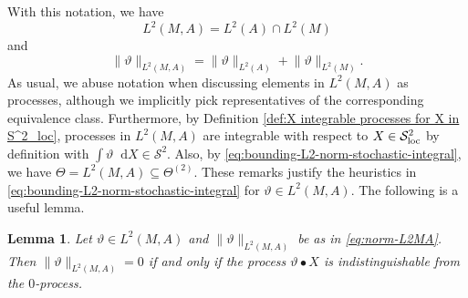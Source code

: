 \documentclass[11pt,a4paper,twoside,openany]{report}
\numberwithin{equation}{section}
\newcommand{\diff}{\mathop{}\!\mathrm{d}}
\theoremstyle{plain} %
\newtheorem{lemma}[theorem]{Lemma}
\theoremstyle{definition} %
\theoremstyle{remark} %
\begin{document}
With this notation, we have
\begin{equation*}
    L^2(M,A)=L^2(A)\cap L^2(M)
\end{equation*}
and \begin{equation}\label{eq:norm-L2MA}
    \lVert \vartheta\rVert_{L^2(M,A)}=\lVert \vartheta\rVert_{L^2(A)}+\lVert \vartheta\rVert_{L^2(M)}.
\end{equation}
As usual, we abuse notation when discussing elements in \(L^2(M,A)\) as processes, although we implicitly pick representatives of the corresponding equivalence class.
 Furthermore, by  Definition \ref{def:X integrable processes for X in S^2_loc}, processes in \(L^2(M,A)\) are integrable with respect to \(X\in\mathcal{S}^2_{\rm{\rm{loc}}}\) by definition with \(\int \vartheta\diff X\in\mathcal{S}^2\). Also, by \eqref{eq:bounding-L2-norm-stochastic-integral}, we have
\(\Theta=L^2(M,A)\subseteq \Theta^{(2)}\). These remarks justify the heuristics in \eqref{eq:bounding-L2-norm-stochastic-integral} for \(\vartheta\in L^2(M,A)\).
The following is a useful lemma.
\begin{lemma}\label{lemma:norm 0 implies process indistinguishable from 0}
    Let \(\vartheta\in L^2(M,A)\) and \(\lVert\vartheta\rVert_{L^2(M,A)}\) be as in \eqref{eq:norm-L2MA}. Then \(\lVert\vartheta\rVert_{L^2(M,A)}=0\) if and only if the process \(\vartheta\bullet X\) is indistinguishable from the \(0\)-process.
\end{lemma}
\end{document}

